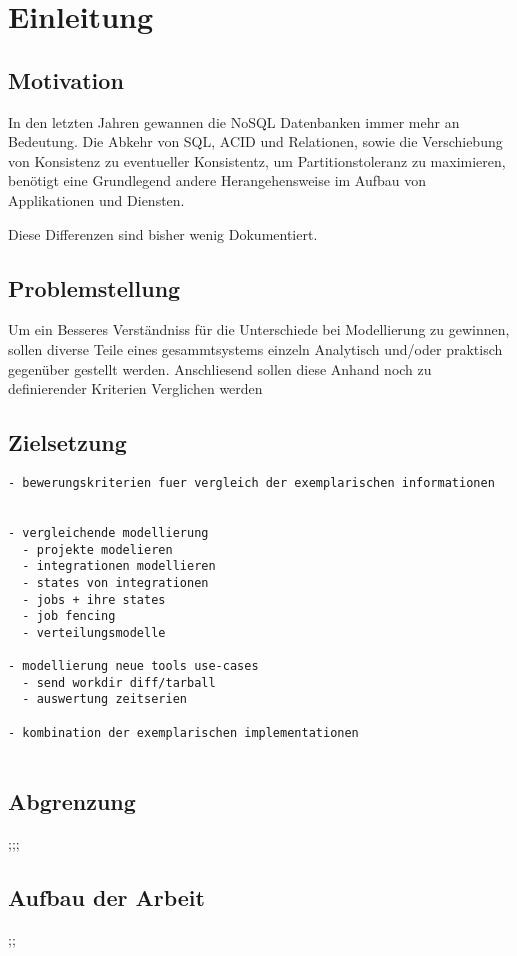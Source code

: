 \chapter{Einleitung}

\section{Motivation}

In den letzten Jahren gewannen die NoSQL Datenbanken immer mehr an Bedeutung.
Die Abkehr von SQL, ACID und Relationen, sowie die Verschiebung von Konsistenz zu eventueller Konsistentz, um Partitionstoleranz zu maximieren,
benötigt eine Grundlegend andere Herangehensweise im Aufbau von Applikationen und Diensten.

Diese Differenzen sind bisher wenig Dokumentiert.

\section{Problemstellung}

Um ein Besseres Verständniss für die Unterschiede bei Modellierung zu gewinnen,
sollen diverse Teile eines gesammtsystems einzeln Analytisch und/oder praktisch gegenüber gestellt werden.
Anschliesend sollen diese Anhand noch zu definierender Kriterien Verglichen werden


\section{Zielsetzung}

\begin{verbatim}
- bewerungskriterien fuer vergleich der exemplarischen informationen


- vergleichende modellierung
  - projekte modelieren
  - integrationen modellieren
  - states von integrationen
  - jobs + ihre states
  - job fencing
  - verteilungsmodelle

- modellierung neue tools use-cases
  - send workdir diff/tarball
  - auswertung zeitserien

- kombination der exemplarischen implementationen


\end{verbatim}

\section{Abgrenzung}


;;;
\section{Aufbau der Arbeit}
;;
